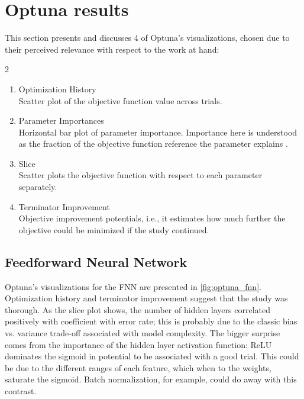 \section{Optuna results}
\label{sec:optuna}

This section presents and discusses 4 of Optuna's visualizations, chosen
due to their perceived relevance with respect to the work at hand:

\begin{multicols}{2}
\begin{enumerate}
    \item Optimization History \\
    Scatter plot of the objective function value across trials.

    \item Parameter Importances \\
    Horizontal bar plot of parameter importance.
    Importance here is understood as the fraction of the objective function reference the parameter explains \cite{pmlr-v32-hutter14}.
    
    \item Slice \\
    Scatter plots the objective function with respect to each parameter separately.

    \item Terminator Improvement \\
    Objective improvement potentials, 
    i.e., it estimates how much further the objective could be minimized if the study continued. 
\end{enumerate}
\end{multicols}

\subsection{Feedforward Neural Network}

Optuna's visualizations for the FNN are presented in \cref{fig:optuna_fnn}.
Optimization history and terminator improvement suggest that the study was thorough.
%
As the slice plot shows, the number of hidden layers correlated positively with coefficient with error rate;
this is probably due to the classic bias vs. variance trade-off associated with model complexity.
The bigger surprise comes from the importance of the hidden layer activation function:
ReLU dominates the sigmoid in potential to be associated with a good trial. 
%
This could be due to the different ranges of each feature, which when to the weights, saturate the sigmoid.
Batch normalization, for example, could do away with this contrast.

